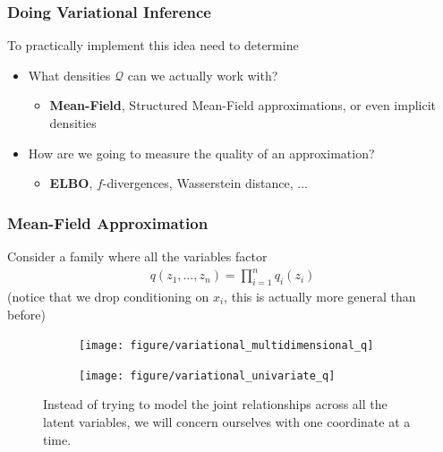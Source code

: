 \documentclass[10pt,mathserif]{beamer}
\begin{document}
\begin{frame}
  \frametitle{Doing Variational Inference}
  To practically implement this idea need to determine
  \begin{itemize}
  \item What densities $\mathcal{Q}$ can we actually work with?
    \begin{itemize}
    \item \textbf{Mean-Field}, Structured Mean-Field approximations, or even implicit densities
    \end{itemize}
  \item How are we going to measure the quality of an approximation?
    \begin{itemize}
    \item \textbf{ELBO}, $f$-divergences, Wasserstein distance, ...
    \end{itemize}
  \end{itemize}
\end{frame}

\begin{frame}
  \frametitle{Mean-Field Approximation}
  Consider a family where all the variables factor
  \begin{align*}
    q\left(z_1, \dots, z_n\right) = \prod_{i = 1}^{n} q_{i}\left(z_i\right)
  \end{align*}
  (notice that we drop conditioning on $x_i$, this is actually more general than
  before)
\begin{figure}
  \begin{subfigure}{0.2\paperwidth}
    \texttt{[image: figure/variational\_multidimensional\_q]}
  \end{subfigure}
  \begin{subfigure}{0.2\paperwidth}
    \texttt{[image: figure/variational\_univariate\_q]}
  \end{subfigure}
  \caption{Instead of trying to model the joint relationships across all the
    latent variables, we will concern ourselves with one coordinate at a
    time. \label{fig:variational_multidimensional_q}}
\end{figure}
\end{frame}
\end{document}
